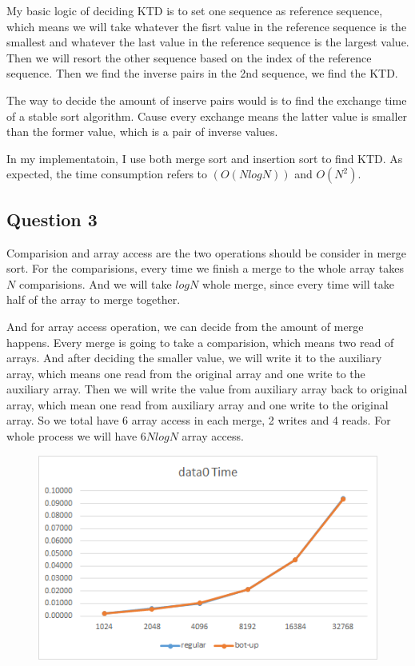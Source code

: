 \documentclass[conference]{IEEEtran}
\begin{document}
My basic logic of deciding KTD is to set one sequence as reference sequence, which
means we will take whatever the fisrt value in the reference sequence is the smallest
and whatever the last value in the reference sequence is the largest value. Then we 
will resort the other sequence based on the index of the reference sequence. Then we 
find the inverse pairs in the 2nd sequence, we find the KTD.

The way to decide the amount of inserve pairs would is to find the exchange time of 
a stable sort algorithm. Cause every exchange means the latter value is smaller than
the former value, which is a pair of inverse values.

In my implementatoin, I use both merge sort and insertion sort to find KTD. As expected,
the time consumption refers to $(O(NlogN))$ and $O(N^2)$.

\subsection*{Question 3}
Comparision and array access are the two operations should be consider in merge sort. 
For the comparisions, every time we finish a merge to the whole array takes $N$ comparisions.
And we will take $logN$ whole merge, since every time will take half of the array to 
merge together. 

And for array access operation, we can decide from the amount of merge happens. Every merge
is going to take a comparision, which means two read of arrays. And after deciding the smaller
value, we will write it to the auxiliary array, which means one read from the original array 
and one write to the auxiliary array. Then we will write the value from auxiliary array back to
original array, which mean one read from auxiliary array and one write to the original array.
So we total have 6 array access in each merge, 2 writes and 4 reads. For whole process we will
have $6NlogN$ array access.


\begin{figure}[H]
    \centerline{\includegraphics[scale=0.65]{Pic/pic8.png}}
\end{figure}
\end{document}
